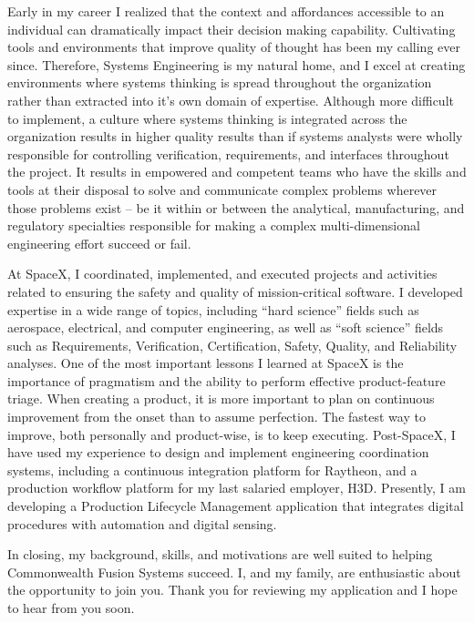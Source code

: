 \begin{cvletter}


Early in my career I realized that the context and affordances accessible to an individual can
dramatically impact their decision making capability. Cultivating tools and environments that
improve quality of thought has been my calling ever since. Therefore, Systems Engineering is my
natural home, and I excel at creating environments where systems thinking is spread throughout the
organization rather than extracted into it's own domain of expertise. Although more difficult to
implement, a culture where systems thinking is integrated across the organization results in higher
quality results than if systems analysts were wholly responsible for controlling verification,
requirements, and interfaces throughout the project. It results in empowered and competent teams who
have the skills and tools at their disposal to solve and communicate complex problems wherever those
problems exist -- be it within or between the analytical, manufacturing, and regulatory specialties
responsible for making a complex multi-dimensional engineering effort succeed or fail.

At SpaceX, I coordinated, implemented, and executed projects and activities related to ensuring the
safety and quality of mission-critical software. I developed expertise in a wide range of topics,
including ``hard science'' fields such as aerospace, electrical, and computer engineering, as well
as ``soft science'' fields such as Requirements, Verification, Certification, Safety, Quality, and
Reliability analyses. One of the most important lessons I learned at SpaceX is the importance of
pragmatism and the ability to perform effective product-feature triage. When creating a product, it
is more important to plan on continuous improvement from the onset than to assume perfection. The
fastest way to improve, both personally and product-wise, is to keep executing. Post-SpaceX, I have
used my experience to design and implement engineering coordination systems, including a continuous
integration platform for Raytheon, and a production workflow platform for my last salaried employer,
H3D. Presently, I am developing a Production Lifecycle Management application that integrates
digital procedures with automation and digital sensing.

In closing, my background, skills, and motivations are well suited to helping Commonwealth Fusion
Systems succeed. I, and my family, are enthusiastic about the opportunity to join you. Thank you for
reviewing my application and I hope to hear from you soon.


\end{cvletter}

